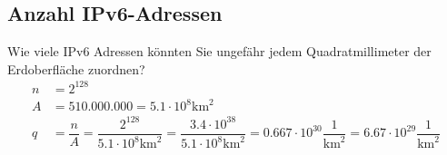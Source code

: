 \setcounter{section}{4}
\setcounter{subsection}{15} %
\subsection{Anzahl IPv6-Adressen}

Wie viele IPv6 Adressen könnten Sie ungefähr jedem Quadratmillimeter der
Erdoberfläche zuordnen?
\begin{align*}
    n &= 2^{128} \\
    A &= 510.000.000 = 5.1 \cdot 10^8 \text{km}^2 \\[5pt]
    q &= \dfrac{n}{A} = \dfrac{2^{128}}{5.1 \cdot 10^8 \text{km}^2} = \dfrac{3.4 \cdot 10^{38}}{5.1 \cdot 10^8 \text{km}^2} = 0.667 \cdot 10^{30} \dfrac{1}{\text{km}^2} = 6.67 \cdot 10^{29} \dfrac{1}{\text{km}^2}
\end{align*}
